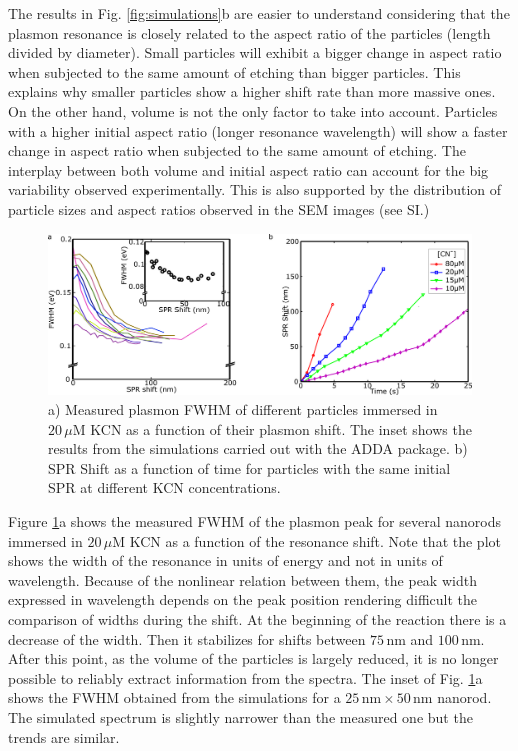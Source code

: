 \documentclass[twoside,twocolumn,11pt]{article}
\newcommand{\nm}{\ensuremath{\,\textrm{nm}}}
\newcommand{\uM}{\ensuremath{\,\mu\textrm{M}}}
\begin{document}
The results in Fig. \ref{fig:simulations}b are easier to understand
considering that the plasmon resonance is closely related to the aspect ratio of
the particles (length divided by diameter). Small particles will exhibit a
bigger change in aspect ratio when subjected to the same amount of etching than
bigger particles. This explains why smaller particles show a higher shift rate
than more massive ones. On the other hand, volume is not the only factor to take
into account. Particles with a higher initial aspect ratio (longer resonance
wavelength) will show a faster change in aspect ratio when subjected to the same
amount of etching. The interplay between both volume and initial aspect ratio
can account for the big variability observed experimentally. This is also
supported by the distribution of particle sizes and aspect ratios observed in
the SEM images (see SI.)

\begin{figure}[htp]
 \centering
 \includegraphics[width=\textwidth]{Figures/03_Shifts/shifts.png}
 \caption{a) Measured plasmon FWHM of different particles immersed in $20\uM$
 KCN as a function of their plasmon shift. The inset shows the results from the
 simulations carried out with the ADDA package. b) SPR Shift as a function of
 time for particles with the same initial SPR at different KCN concentrations.}
 \label{fig:FWHM}
\end{figure}

Figure \ref{fig:FWHM}a shows the measured FWHM of the plasmon peak for several
nanorods immersed in $20\uM$ KCN as a function of the resonance shift. Note that
the plot shows the width of the resonance in units of energy and not in units of
wavelength. Because of the nonlinear relation between them, the peak width
expressed in wavelength depends on the peak position rendering difficult the
comparison of widths during the shift. At the beginning of the reaction there is
a decrease of the width. Then it stabilizes for shifts between $75\nm$ and
$100\nm$. After this point, as the volume of the particles is largely reduced,
it is no longer possible to reliably extract information from the spectra. The
inset of Fig. \ref{fig:FWHM}a shows the FWHM obtained from the simulations for
a $25\nm\times50\nm$ nanorod. The simulated spectrum is slightly narrower than
the measured one but the trends are similar.
\end{document}

